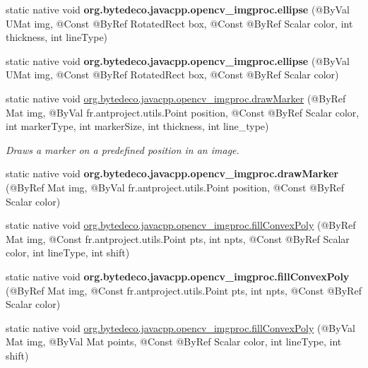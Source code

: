 \begin{DoxyCompactItemize}
\item 
\mbox{\label{group__imgproc__draw_ga582f1cb3f0923be36ecf0156ff9b25d1}} 
static native void {\bfseries org.\+bytedeco.\+javacpp.\+opencv\+\_\+imgproc.\+ellipse} (@By\+Val U\+Mat img, @Const @By\+Ref Rotated\+Rect box, @Const @By\+Ref Scalar color, int thickness, int line\+Type)
\item 
\mbox{\label{group__imgproc__draw_ga387fe3dea4735080b3db76bb9180d002}} 
static native void {\bfseries org.\+bytedeco.\+javacpp.\+opencv\+\_\+imgproc.\+ellipse} (@By\+Val U\+Mat img, @Const @By\+Ref Rotated\+Rect box, @Const @By\+Ref Scalar color)
\item 
static native void \hyperlink{group__imgproc__draw_gaedc7348c70c6b2c486689107ee346af3}{org.\+bytedeco.\+javacpp.\+opencv\+\_\+imgproc.\+draw\+Marker} (@By\+Ref Mat img, @By\+Val fr.antproject.utils.Point position, @Const @By\+Ref Scalar color, int marker\+Type, int marker\+Size, int thickness, int line\+\_\+type)
\begin{DoxyCompactList}\small\item\em Draws a marker on a predefined position in an image. \end{DoxyCompactList}\item 
\mbox{\label{group__imgproc__draw_ga5b4d20cfadb1b88098caa99988b204db}} 
static native void {\bfseries org.\+bytedeco.\+javacpp.\+opencv\+\_\+imgproc.\+draw\+Marker} (@By\+Ref Mat img, @By\+Val fr.antproject.utils.Point position, @Const @By\+Ref Scalar color)
\item 
static native void \hyperlink{group__imgproc__draw_ga825cdf4013e0a71e60022826a5d47037}{org.\+bytedeco.\+javacpp.\+opencv\+\_\+imgproc.\+fill\+Convex\+Poly} (@By\+Ref Mat img, @Const fr.antproject.utils.Point pts, int npts, @Const @By\+Ref Scalar color, int line\+Type, int shift)
\item 
\mbox{\label{group__imgproc__draw_ga81e45058cc3144cb12b3f706b801898f}} 
static native void {\bfseries org.\+bytedeco.\+javacpp.\+opencv\+\_\+imgproc.\+fill\+Convex\+Poly} (@By\+Ref Mat img, @Const fr.antproject.utils.Point pts, int npts, @Const @By\+Ref Scalar color)
\item 
static native void \hyperlink{group__imgproc__draw_gadde734279c0c012260b7bf8a33f44fff}{org.\+bytedeco.\+javacpp.\+opencv\+\_\+imgproc.\+fill\+Convex\+Poly} (@By\+Val Mat img, @By\+Val Mat points, @Const @By\+Ref Scalar color, int line\+Type, int shift)

\end{DoxyCompactItemize}
